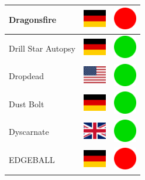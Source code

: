 \documentclass[12pt, a4paper, twoside]{report}
\begin{document}
\begin{center}
\begin{longtable}{|p{5cm}|p{2cm}|p{2cm}|}
 Dragonsfire                                                & \includegraphics[width=1cm]{4x3/de} &   \includegraphics[width=1cm]{likes/n} \\ \hline
 Drill Star Autopsy                                         & \includegraphics[width=1cm]{4x3/de} &   \includegraphics[width=1cm]{likes/y} \\ \hline
 Dropdead                                                   & \includegraphics[width=1cm]{4x3/us} &   \includegraphics[width=1cm]{likes/y} \\ \hline
 Dust Bolt                                                  & \includegraphics[width=1cm]{4x3/de} &   \includegraphics[width=1cm]{likes/y} \\ \hline
 Dyscarnate                                                 & \includegraphics[width=1cm]{4x3/gb} &   \includegraphics[width=1cm]{likes/y} \\ \hline
 EDGEBALL                                                   & \includegraphics[width=1cm]{4x3/de} &   \includegraphics[width=1cm]{likes/n} \\ \hline

\end{longtable}
\end{center}
\end{document}
